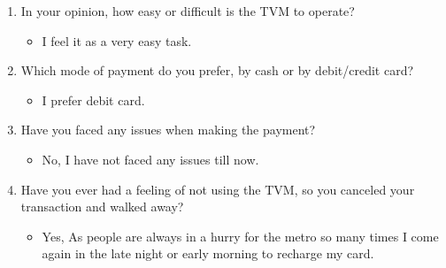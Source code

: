 \documentclass[15pt]{article}
\begin{document}
\begin{appendices}
\begin{enumerate}[leftmargin=3em, itemsep=0pt, parsep=0pt, , font=\Large\bfseries]
\begin{enumerate}[leftmargin=2em, itemsep=0pt, parsep=0pt, , font=\Large\bfseries]
\begin{itemize}
            \end{itemize}
            \vspace{0.2cm}
        \item {\Large In your opinion, how easy or difficult is the TVM to operate?}
        \vspace{0.1cm}
            \begin{itemize}
                \item {\Large I feel it as a very easy task.}
            \end{itemize}
            \vspace{0.2cm}
        \item {\Large Which mode of payment do you prefer, by cash or by debit/credit card?}
            \begin{itemize}
                \item {\Large I prefer debit card.}
            \end{itemize}
            \vspace{0.2cm}
        \item {\Large Have you faced any issues when making the payment?}
        \vspace{0.1cm}
            \begin{itemize}
                \item {\Large No, I have not faced any issues till now.}
            \end{itemize}
            \vspace{0.2cm}
        \item {\Large Have you ever had a feeling of not using the TVM, so you canceled your transaction and walked away?}
        \vspace{0.1cm}
            \begin{itemize}
                \item {\Large Yes, As people are always in a hurry for the metro so many times I come again in the late night or early morning to recharge my card.}
            \end{itemize}
            \vspace{0.2cm}
    \end{enumerate}
    

\end{enumerate}
\end{appendices}
\end{document}
